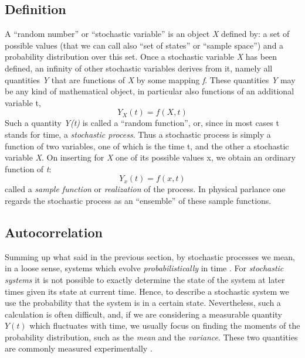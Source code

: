 \documentclass[12pt,a4paper]{report}
\begin{document}
\subsection{Definition}
A ``random number'' or ``stochastic variable'' is an object \emph{X} defined by: a set of possible values (that we can call also ``set of states'' or ``sample space'') and a probability distribution over this set. Once a stochastic variable \emph{X} has been defined, an infinity of other stochastic variables derives from it, namely all quantities \emph{Y} that are functions of \emph{X} by some mapping \emph{f}. These quantities \emph{Y} may be any kind of mathematical object, in particular also functions of an additional variable t,
\begin{equation}
    Y_{X}(t) = f(X,t)
\end{equation}
Such a quantity \emph{Y(t)} is called a ``random function'', or, since in most cases t stands for time, a \emph{stochastic process}. Thus a stochastic process is simply a function of two variables, one of which is the time t, and the other a stochastic variable \emph{X}. On inserting for \emph{X} one of its possible values x, we obtain an ordinary function of \emph{t}: 
\begin{equation}
    Y_{x}(t) = f(x,t) 
\end{equation}
called a \emph{sample function} or \emph{realization} of the process. In physical parlance one regards the stochastic process as an ``ensemble'' of these sample functions.

\subsection{Autocorrelation}
Summing up what said in the previous section, by stochastic processes we mean, in a loose sense, systems which evolve \emph{probabilistically} in time \cite{Hand}. For \emph{stochastic systems} it is not possible to exactly determine the state of the system at later times given its state at current time. Hence, to describe a stochastic system we use the probability that the system is in a certain state. Nevertheless, such a calculation is often difficult, and, if we are considering a measurable quantity $Y(t)$ which fluctuates with time, we usually focus on finding the moments of the probability distribution, such as the \emph{mean} and the \emph{variance}. These two quantities are commonly measured experimentally \cite{Brizi}.
\end{document}
